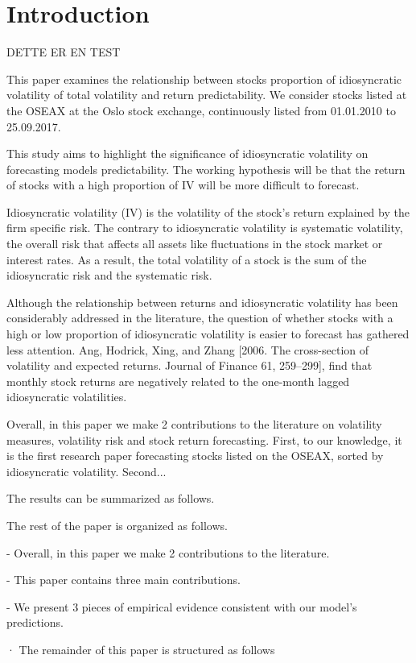 \chapter{Introduction}

DETTE ER EN TEST

This paper examines the relationship between stocks proportion of idiosyncratic volatility of total volatility and return predictability. We consider stocks listed at the OSEAX at the Oslo stock exchange, continuously listed from 01.01.2010 to 25.09.2017. 

This  study  aims  to highlight the significance of idiosyncratic volatility on forecasting models predictability. The working hypothesis will be that the return of stocks with a high proportion of IV will be more difficult to forecast. 
 
Idiosyncratic volatility (IV) is the volatility of the stock's return explained by the firm specific risk. The contrary to idiosyncratic volatility is systematic volatility, the overall risk that affects all assets like fluctuations in the stock market or interest rates. As a result, the total volatility of a stock is the sum of the idiosyncratic risk and the systematic risk. 

Although  the  relationship between returns and idiosyncratic volatility has been  considerably addressed  in the  literature, the question of whether stocks with a high or low proportion of idiosyncratic volatility is easier to forecast has gathered less attention. Ang, Hodrick, Xing, and Zhang [2006. The cross-section of volatility and expected returns. Journal of Finance 61, 259–299], find that monthly stock returns are negatively related to the one-month lagged idiosyncratic volatilities.

Overall, in this paper we make 2 contributions to the literature  on  volatility  measures, volatility  risk and  stock  return forecasting.  First,  to our knowledge, it  is  the first research paper forecasting stocks listed on the OSEAX, sorted by idiosyncratic volatility. Second...

The results can be summarized as follows. 

The rest of the paper is organized as follows. 

- Overall, in this paper we make 2 contributions to the literature.

- This paper contains three main contributions.

- We present 3 pieces of empirical evidence consistent with our model’s predictions.

· The remainder of this paper is structured as follows